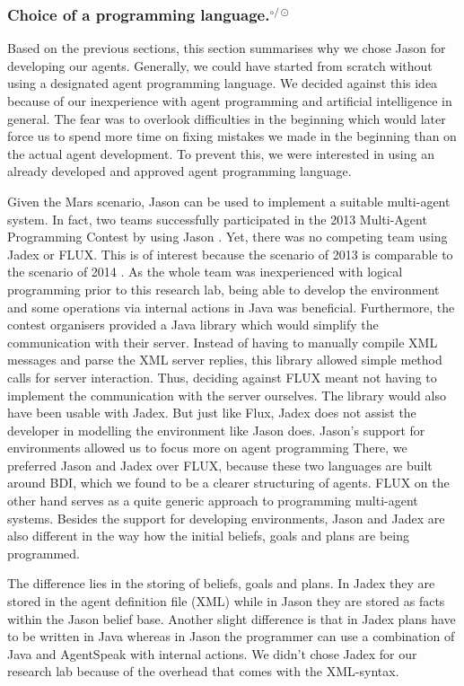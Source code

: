 \subsubsection[Choice of a programming language.]{Choice of a programming language.$^{\circ/\odot}$}\label{fun:apl_choice}
Based on the previous sections, this section summarises why we chose Jason for developing our agents.
Generally, we could have started from scratch without using a designated agent programming language.
We decided against this idea because of our inexperience with agent programming and artificial intelligence in general.
The fear was to overlook difficulties in the beginning which would later force us to spend more time on fixing mistakes we made in the beginning than on the actual agent development.
To prevent this, we were interested in using an already developed and approved agent programming language.

Given the Mars scenario, Jason can be used to implement a suitable multi-agent system.
In fact, two teams successfully participated in the 2013 Multi-Agent Programming Contest by using Jason \cite{ahlbrecht_multi_2013}. %
Yet, there was no competing team using Jadex or FLUX.
This is of interest because the scenario of 2013 is comparable to the scenario of 2014 \cite{ahlbrecht_mapc_2014}. %
As the whole team was inexperienced with logical programming prior to this research lab, being able to develop the environment and some operations via internal actions in Java was beneficial.
Furthermore, the contest organisers provided a Java library which would simplify the communication with their server.
Instead of having to manually compile XML messages and parse the XML server replies, this library allowed simple method calls for server interaction.
Thus, deciding against FLUX meant not having to implement the communication with the server ourselves.
The library would also have been usable with Jadex.
But just like Flux, Jadex does not assist the developer in modelling the environment like Jason does.
Jason's support for environments allowed us to focus more on agent programming
There, we preferred Jason and Jadex over FLUX, because these two languages are built around BDI, which we found to be a clearer structuring of agents.
FLUX on the other hand serves as a quite generic approach to programming multi-agent systems.
Besides the support for developing environments, Jason and Jadex are also different in the way how the initial beliefs, goals and plans are being programmed.

The difference lies in the storing of beliefs, goals and plans.
In Jadex they are stored in the agent definition file (XML) while in Jason they are stored as facts within the Jason belief base.
Another slight difference is that in Jadex plans have to be written in Java whereas in Jason the programmer can use a combination of Java and AgentSpeak with internal actions.
We didn't chose Jadex for our research lab because of the overhead that comes with the XML-syntax.

